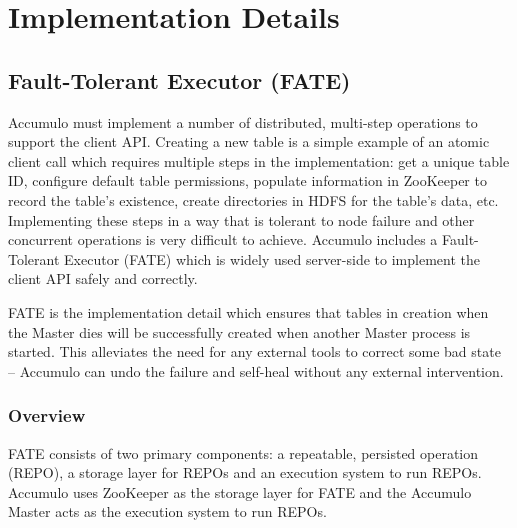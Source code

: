 
%
%

\chapter{Implementation Details}

\section{Fault-Tolerant Executor (FATE)}

Accumulo must implement a number of distributed, multi-step operations to support
the client API. Creating a new table is a simple example of an atomic client call
which requires multiple steps in the implementation: get a unique table ID, configure
default table permissions, populate information in ZooKeeper to record the table's
existence, create directories in HDFS for the table's data, etc. Implementing these
steps in a way that is tolerant to node failure and other concurrent operations is
very difficult to achieve. Accumulo includes a Fault-Tolerant Executor (FATE) which
is widely used server-side to implement the client API safely and correctly.

FATE is the implementation detail which ensures that tables in creation when the
Master dies will be successfully created when another Master process is started.
This alleviates the need for any external tools to correct some bad state -- Accumulo can
undo the failure and self-heal without any external intervention.

\subsection{Overview}

FATE consists of two primary components: a repeatable, persisted operation (REPO), a storage
layer for REPOs and an execution system to run REPOs. Accumulo uses ZooKeeper as the storage
layer for FATE and the Accumulo Master acts as the execution system to run REPOs.

